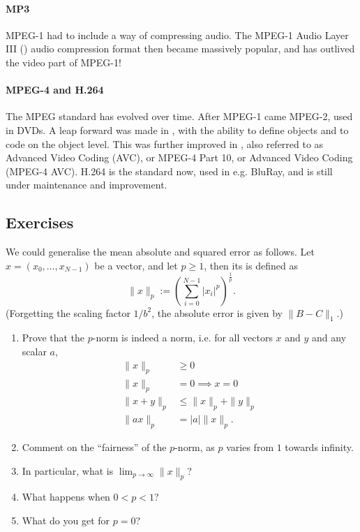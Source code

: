 \documentclass[a4paper, 11pt, openany]{book}
\begin{document}
\paragraph{MP3} MPEG-1 had to include a way of compressing audio. The MPEG-1 Audio Layer III () audio compression format then became massively popular, and has outlived the video part of MPEG-1!

\paragraph{MPEG-4 and H.264} The MPEG standard has evolved over time. After MPEG-1 came MPEG-2, used in DVDs. A leap forward was made in , with the ability to define objects and to code on the object level. This was further improved in , also referred to as Advanced Video Coding (AVC), or MPEG-4 Part 10, or Advanced Video Coding (MPEG-4 AVC). H.264 is the standard now, used in e.g. BluRay, and is still under maintenance and improvement.



\subsection{Exercises}
\begin{exercise}
We could generalise the mean absolute and squared error as follows. Let $x = (x_0, \dots, x_{N-1})$ be a vector, and let $p \ge 1$, then its  is defined as
\[
    \| x \|_p := \left( \sum_{i=0}^{N-1} |x_i|^p \right)^{\frac{1}{p}}.
\]
(Forgetting the scaling factor $1/b^2$, the absolute error is given by $\| B - C \|_1$.)
\begin{enumerate}
    \item Prove that the $p$-norm is indeed a norm, i.e. for all vectors $x$ and $y$ and any scalar $a$,
    \begin{align*}
        \| x \|_p &\ge 0\\
        \| x \|_p &=0 \implies x = 0\\
        \|x + y \|_p &\le \| x \|_p + \| y \|_p\\
        \| ax \|_p &= |a| \| x \|_p.
    \end{align*}

    \item Comment on the ``fairness'' of the $p$-norm, as $p$ varies from $1$ towards infinity.

    \item In particular, what is $\lim_{p \to \infty} \| x\|_p$?

    \item What happens when $0 < p < 1$?

    \item What do you get for $p = 0$?
\end{enumerate}
\end{exercise}
\end{document}
